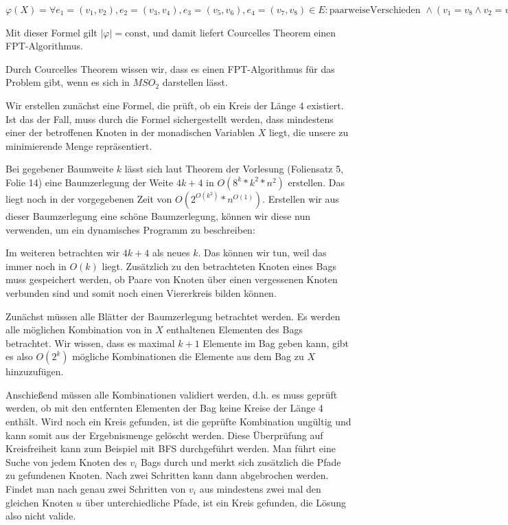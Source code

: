 

\DeclareMathOperator{\vc}{vc}





\subexercise

$\varphi(X) = \forall e_1 = (v_1, v_2), e_2 = (v_3, v_4), e_3 = (v_5, v_6), e_4 = (v_7, v_8) \in E \colon \text{paarweiseVerschieden } \wedge (v_1 = v_8 \wedge v_2 = v_3 \wedge v_4 = v_5 \wedge v_6 = v_7) \rightarrow (v_1, \dots, v_8) \cap X \neq \emptyset$

Mit dieser Formel gilt $|\varphi| = \text{const}$, und damit liefert Courcelles Theorem einen FPT-Algorithmus.
\how

Durch Courcelles Theorem wissen wir, dass es einen FPT-Algorithmus für das Problem gibt, wenn es sich in $MSO_2$ darstellen lässt.

Wir erstellen zunächst eine Formel, die prüft, ob ein Kreis der Länge 4 existiert. Ist das der Fall, muss durch die Formel sichergestellt werden, dass mindestens einer der betroffenen Knoten in der monadischen Variablen $X$ liegt, die unsere zu minimierende Menge repräsentiert.

\subexercise

Bei gegebener Baumweite $k$ lässt sich laut Theorem der Vorlesung (Foliensatz 5, Folie 14) eine Baumzerlegung der Weite $4k+4$ in $O(8^k*k^2*n^2)$ erstellen. Das liegt noch in der vorgegebenen Zeit von $O(2^{O(k^2)}*n^{O(1)})$. Erstellen wir aus dieser Baumzerlegung eine schöne Baumzerlegung, können wir diese nun verwenden, um ein dynamisches Programm zu beschreiben:

Im weiteren betrachten wir $4k+4$ als neues $k$. Das können wir tun, weil das immer noch in $O(k)$ liegt. Zusätzlich zu den betrachteten Knoten eines Bags muss gespeichert werden, ob Paare von Knoten über einen vergessenen Knoten verbunden sind und somit noch einen Viererkreis bilden können.

Zunächst müssen alle Blätter der Baumzerlegung betrachtet werden. Es werden alle möglichen Kombination von in $X$ enthaltenen Elementen des Bags betrachtet. Wir wissen, dass es maximal $k+1$ Elemente im Bag geben kann, gibt es also $O(2^k)$ mögliche Kombinationen die Elemente aus dem Bag zu $X$ hinzuzufügen.

Anschießend müssen alle Kombinationen validiert werden, d.h. es muss geprüft werden, ob mit den entfernten Elementen der Bag keine Kreise der Länge 4 enthält. Wird noch ein Kreis gefunden, ist die geprüfte Kombination ungültig und kann somit aus der Ergebnismenge gelöscht werden. Diese Überprüfung auf Kreisfreiheit kann zum Beispiel mit BFS durchgeführt werden. Man führt eine Suche von jedem Knoten des $v_i$ Bags durch und merkt sich zusätzlich die Pfade zu gefundenen Knoten. Nach zwei Schritten kann dann abgebrochen werden. Findet man nach genau zwei Schritten von $v_i$ aus mindestens zwei mal den gleichen Knoten $u$ über unterchiedliche Pfade, ist ein Kreis gefunden, die Lösung also nicht valide.


